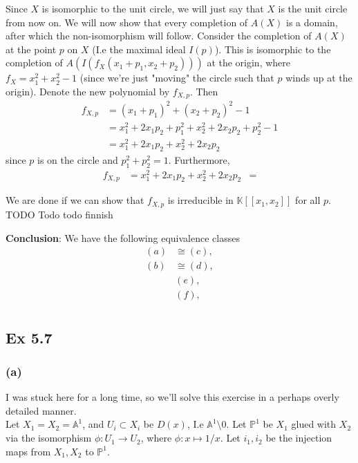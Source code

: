 \documentclass{article}
\theoremstyle{definition}
\newcommand{\K}{\mathbb{K}}
\renewcommand{\P}{\mathbb{P}}
\newcommand{\A}{\mathbb{A}}
\renewcommand{\AA}[1]{\A^{#1}}
\newcommand{\PP}[1]{\P^{#1}}
\begin{document}
Since $X$ is isomorphic to the unit circle, we will just say that $X$ is the
unit circle from now on. We will now show that every completion of $A(X)$ is a
domain, after which the non-isomorphism will follow. Consider the completion of
$A(X)$ at the point $p$ on $X$ (I.e the maximal ideal $I(p)$). This is
isomorphic to the completion of $A(I(f_X(x_1 + p_1, x_2 + p_2)))$ at the
origin, where $f_X = x_1^{2} + x_2^{2} - 1$ (since we're just "moving" the
circle such that $p$ winds up at the origin). Denote the new polynomial by
$f_{X, p}$. Then
\begin{align*}
	f_{X, p} 
	&= 
	(x_1 + p_1)^{2} + (x_2 + p_2)^{2} - 1 \\
	&= 
	x_1^{2} + 2x_1p_2 + p_1^{2} + x_2^{2} + 2x_2p_2 + p_2^{2} - 1 \\
	&=
	x_1^{2} + 2x_1p_2 + x_2^{2} + 2x_2p_2
\end{align*} 
since $p$ is on the circle and $p_1^{2} + p_2^{2} = 1$. Furthermore,
\begin{align*}
	f_{X, p}
	&=
	x_1^{2} + 2x_1p_2 + x_2^{2} + 2x_2p_2
	&=
\end{align*}


We are done if we can show that $f_{X, p}$ is
irreducible in $\K[[x_1, x_2]]$ for all $p$. TODO Todo todo finnish

\textbf{Conclusion}:
We have the following equivalence classes
\begin{align*}
	(a) &\cong (c), \\
	(b) &\cong (d), \\
	&(e), \\
	&(f), \\
\end{align*}

\subsection*{Ex 5.7} 

\subsubsection*{(a)} 

I was stuck here for a long time, so we'll solve this exercise in a perhaps
overly detailed manner. \\

Let $X_1 = X_2 = \AA{1}$, and $U_i \subset X_i$ be
$D(x)$, I.e $\AA{1} \setminus 0$. Let $\PP{1}$ be $X_1$ glued with $X_2$ via
the isomorphism $\phi : U_1 \to U_2$, where $\phi : x \mapsto 1/x$. Let $i_1,
i_2$ be the injection maps from $X_1, X_2$ to $\PP{1}$. \\
\end{document}
